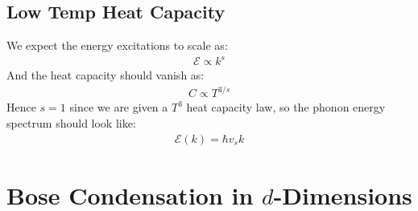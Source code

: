 \documentclass[12pt]{article}
\begin{document}
\subsection{Low Temp Heat Capacity}
We expect the energy excitations to scale as:
\begin{align*}
  \mathcal{E}\propto k^s
\end{align*}
And the heat capacity should vanish as:
\begin{align*}
  C\propto T^{3/s}
\end{align*}
Hence $s=1$ since we are given a $T^3$ heat capacity law, so the phonon energy spectrum should look like:
\begin{align*}
  \mathcal{E}(k)=\hbar v_sk
\end{align*}

\section{Bose Condensation in $d$-Dimensions}
\end{document}

